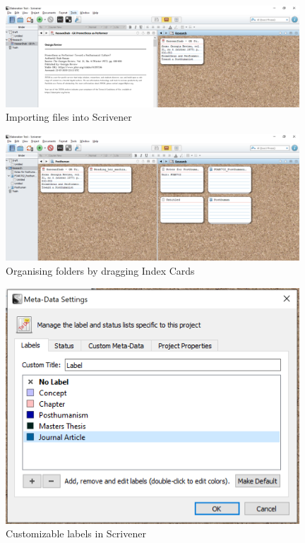 \documentclass{article}
\begin{document}
\begin{figure}[htbp]
    \centering
    \includegraphics[width=11cm]{Images/ScrivenerTest001.PNG}
    \caption{Importing files into Scrivener}
    \label{fig:Scivener Research Screen}
\end{figure}

\begin{figure}[htbp]
    \centering
    \includegraphics[width=11cm]{Images/ScrivenerTest002.PNG}
    \caption{Organising folders by dragging Index Cards}
    \label{fig:Scrivener Folder Organisation}
\end{figure}

\begin{figure}[htbp]
    \centering
    \includegraphics[width=11cm]{Images/ScrivenerTest003.PNG}
    \caption{Customizable labels in Scrivener}
    \label{fig:Scrivener Labels}
\end{figure}
\end{document}

